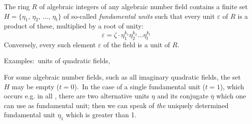 \documentclass[12pt]{article}
\begin{document}
The ring $R$ of algebraic integers of any algebraic number 
field contains a finite set 
$H = \{\eta_1,\, \eta_2,\, \ldots,\, \eta_t\}$ of so-called 
{\em fundamental units} such that every unit $\varepsilon$ of 
$R$ is a  product of 
these, multiplied by a root of unity:
   $$\varepsilon = \zeta\!\cdot\!\eta_1^{k_1}\eta_2^{k_2}\ldots\eta_t^{k_t}$$
Conversely, every such element $\varepsilon$ of the field is a 
unit of $R$.

Examples:\, units of quadratic fields,\, 


For some algebraic number fields, such as all imaginary 
quadratic fields, the set $H$ may be empty ($t = 0$).\, In the 
case of a single fundamental unit ($t = 1$), which occurs e.g. 
in all 
, 
there are two alternative units 
$\eta$ and its conjugate $\overline{\eta}$ which one can use as 
fundamental unit; then we can speak of {\em the} uniquely 
determined fundamental unit $\eta_1$ which is greater than 1.
\end{document}
